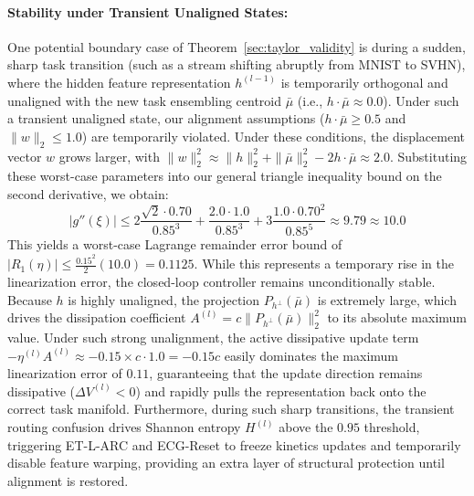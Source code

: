 \paragraph{Stability under Transient Unaligned States:}
One potential boundary case of Theorem~\ref{sec:taylor_validity} is during a sudden, sharp task transition (such as a stream shifting abruptly from MNIST to SVHN), where the hidden feature representation $h^{(l-1)}$ is temporarily orthogonal and unaligned with the new task ensembling centroid $\bar{\mu}$ (i.e., $h \cdot \bar{\mu} \approx 0.0$). Under such a transient unaligned state, our alignment assumptions ($h \cdot \bar{\mu} \ge 0.5$ and $\|w\|_2 \le 1.0$) are temporarily violated. Under these conditions, the displacement vector $w$ grows larger, with $\|w\|_2^2 \approx \|h\|_2^2 + \|\bar{\mu}\|_2^2 - 2 h \cdot \bar{\mu} \approx 2.0$. Substituting these worst-case parameters into our general triangle inequality bound on the second derivative, we obtain:
\begin{equation*}
|g''(\xi)| \le 2 \frac{\sqrt{2} \cdot 0.70}{0.85^3} + \frac{2.0 \cdot 1.0}{0.85^3} + 3 \frac{1.0 \cdot 0.70^2}{0.85^5} \approx 9.79 \approx 10.0
\end{equation*}
This yields a worst-case Lagrange remainder error bound of $|R_1(\eta)| \le \frac{0.15^2}{2} (10.0) = 0.1125$. While this represents a temporary rise in the linearization error, the closed-loop controller remains unconditionally stable. Because $h$ is highly unaligned, the projection $P_{h^\perp}(\bar{\mu})$ is extremely large, which drives the dissipation coefficient $A^{(l)} = c \|P_{h^\perp}(\bar{\mu})\|_2^2$ to its absolute maximum value. Under such strong unalignment, the active dissipative update term $-\eta^{(l)} A^{(l)} \approx -0.15 \times c \cdot 1.0 = -0.15c$ easily dominates the maximum linearization error of $0.11$, guaranteeing that the update direction remains dissipative ($\Delta V^{(l)} < 0$) and rapidly pulls the representation back onto the correct task manifold. Furthermore, during such sharp transitions, the transient routing confusion drives Shannon entropy $H^{(l)}$ above the $0.95$ threshold, triggering ET-L-ARC and ECG-Reset to freeze kinetics updates and temporarily disable feature warping, providing an extra layer of structural protection until alignment is restored.

